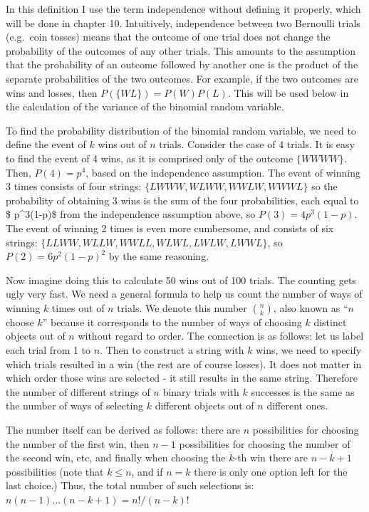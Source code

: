 \documentclass[
  letterpaper,
  DIV=11,
  numbers=noendperiod]{scrreprt}
\begin{document}
In this definition I use the term independence without defining it
properly, which will be done in chapter 10. Intuitively, independence
between two Bernoulli trials (e.g.~coin tosses) means that the outcome
of one trial does not change the probability of the outcomes of any
other trials. This amounts to the assumption that the probability of an
outcome followed by another one is the product of the separate
probabilities of the two outcomes. For example, if the two outcomes are
wins and losses, then \(P(\{WL\}) = P(W)P(L)\). This will be used below
in the calculation of the variance of the binomial random variable.

To find the probability distribution of the binomial random variable, we
need to define the event of \(k\) wins out of \(n\) trials. Consider the
case of 4 trials. It is easy to find the event of 4 wins, as it is
comprised only of the outcome \(\{WWWW\}\). Then, \(P(4) = p^4\), based
on the independence assumption. The event of winning 3 times consists of
four strings: \(\{LWWW, WLWW, WWLW, WWWL\}\) so the probability of
obtaining 3 wins is the sum of the four probabilities, each equal to \$
p\^{}3(1-p)\$ from the independence assumption above, so
\(P(3) = 4p^3(1-p)\). The event of winning 2 times is even more
cumbersome, and consists of six strings:
\(\{ LLWW, WLLW, WWLL, WLWL, LWLW, LWWL\}\), so \(P(2) = 6p^2(1-p)^2\)
by the same reasoning.

Now imagine doing this to calculate 50 wins out of 100 trials. The
counting gets ugly very fast. We need a general formula to help us count
the number of ways of winning \(k\) times out of \(n\) trials. We denote
this number \(\binom{n}{k}\), also known as ``\(n\) choose \(k\)''
because it corresponds to the number of ways of choosing \(k\) distinct
objects out of \(n\) without regard to order. The connection is as
follows: let us label each trial from 1 to \(n\). Then to construct a
string with \(k\) wins, we need to specify which trials resulted in a
win (the rest are of course losses). It does not matter in which order
those wins are selected - it still results in the same string. Therefore
the number of different strings of \(n\) binary trials with \(k\)
successes is the same as the number of ways of selecting \(k\) different
objects out of \(n\) different ones.

The number itself can be derived as follows: there are \(n\)
possibilities for choosing the number of the first win, then \(n-1\)
possibilities for choosing the number of the second win, etc, and
finally when choosing the \(k\)-th win there are \(n-k+1\) possibilities
(note that \(k \leq n\), and if \(n=k\) there is only one option left
for the last choice.) Thus, the total number of such selections is:
\(n(n-1)...(n-k+1) = n!/(n-k)!\)
\end{document}
